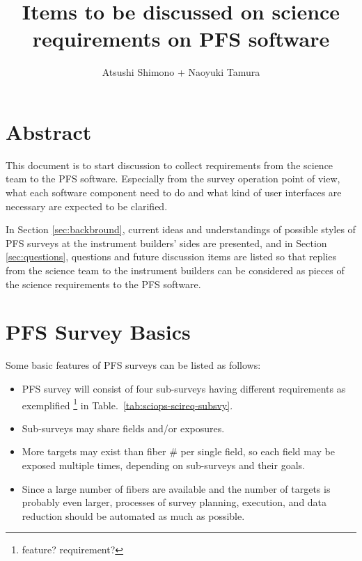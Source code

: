 \documentclass[a4paper,notitlepage]{article}
\title{Items to be discussed on science requirements on PFS software}
\author{Atsushi Shimono + Naoyuki Tamura}
\begin{document}

\ssnhead

\section{Abstract}
\label{sec:abs}

This document is to start discussion to collect requirements from the science 
team to the PFS software. 
Especially from the survey operation point of view, what each software 
component need to do and what kind of user interfaces are necessary 
are expected to be clarified. 

In Section \ref{sec:backbround}, current ideas and understandings 
of possible styles of PFS surveys at the instrument builders' sides are 
presented, 
and in Section \ref{sec:questions}, questions and future discussion items 
are listed so that replies from the science team to the instrument builders 
can be considered as pieces of the science requirements to the PFS software. 


\section{PFS Survey Basics}
\label{sec:background}

Some basic features of PFS surveys can be listed as follows: 
\begin{itemize}
  \item PFS survey will consist of four sub-surveys 
    having different requirements as exemplified 
\footnote{feature? requirement?}
    in Table.~\ref{tab:sciops-scireq-subsvy}. 
  \item Sub-surveys may share fields and/or exposures.
  \item More targets may exist than fiber \# per single field, 
    so each field may be exposed multiple times, 
    depending on sub-surveys and their goals.
  \item Since a large number of fibers are available and the number of targets 
    is probably even larger, processes of survey planning, execution, and 
    data reduction should be automated as much as possible. 
\end{itemize}
\end{document}
